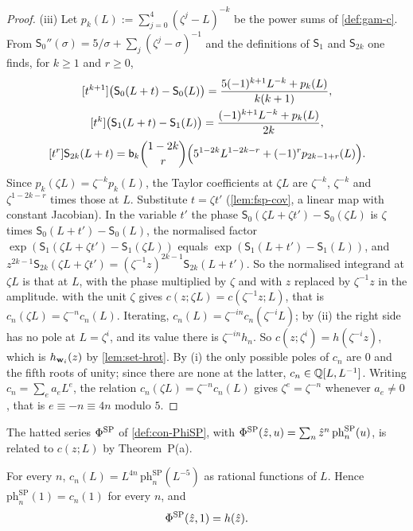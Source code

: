 \begin{proof}
(iii) Let $p_k(L):=\sum_{j=0}^4(\zeta^j-L)^{-k}$ be the power sums of \cref{def:gam-c}. From $\mathsf S_0''(\sigma)=5/\sigma+\sum_j(\zeta^j-\sigma)^{-1}$ and the definitions of $\mathsf S_1$ and $\mathsf S_{2k}$ one finds, for $k\geq 1$ and $r\geq 0$,
\begin{gather*}
\coef{t^{k+1}}\bigl(\mathsf S_0(L+t)-\mathsf S_0(L)\bigr)=\frac{5(-1)^{k+1}L^{-k}+p_k(L)}{k(k+1)},\\
\coef{t^{k}}\bigl(\mathsf S_1(L+t)-\mathsf S_1(L)\bigr)=\frac{(-1)^{k+1}L^{-k}+p_k(L)}{2k},
\end{gather*}
\[
[t^r]\mathsf S_{2k}(L+t)=\mathsf{b}_k\binom{1-2k}{r}\Bigl(5^{1-2k}L^{1-2k-r}+(-1)^rp_{2k-1+r}(L)\Bigr).
\]
Since $p_k(\zeta L)=\zeta^{-k}p_k(L)$, the Taylor coefficients at $\zeta L$ are $\zeta^{-k}$, $\zeta^{-k}$ and $\zeta^{1-2k-r}$ times those at $L$. Substitute $t=\zeta t'$ (\cref{lem:fsp-cov}, a linear map with constant Jacobian). In the variable $t'$ the phase $\mathsf S_0(\zeta L+\zeta t')-\mathsf S_0(\zeta L)$ is $\zeta$ times $\mathsf S_0(L+t')-\mathsf S_0(L)$, the normalised factor $\exp(\mathsf S_1(\zeta L+\zeta t')-\mathsf S_1(\zeta L))$ equals $\exp(\mathsf S_1(L+t')-\mathsf S_1(L))$, and $z^{2k-1}\mathsf S_{2k}(\zeta L+\zeta t')=(\zeta^{-1}z)^{2k-1}\mathsf S_{2k}(L+t')$. So the normalised integrand at $\zeta L$ is that at $L$, with the phase multiplied by $\zeta$ and with $z$ replaced by $\zeta^{-1}z$ in the amplitude.  with the unit $\zeta$ gives $c(z;\zeta L)=c(\zeta^{-1}z;L)$, that is $c_n(\zeta L)=\zeta^{-n}c_n(L)$. Iterating, $c_n(L)=\zeta^{-in}c_n(\zeta^{-i}L)$; by (ii) the right side has no pole at $L=\zeta^i$, and its value there is $\zeta^{-in}h_n$. So $c(z;\zeta^i)=h(\zeta^{-i}z)$, which is $h_{\mathbf{w}_i}(z)$ by \cref{lem:set-hrot}. By (i) the only possible poles of $c_n$ are $0$ and the fifth roots of unity; since there are none at the latter, $c_n\in\mathbb{Q}[L,L^{-1}]$. Writing $c_n=\sum_ea_eL^e$, the relation $c_n(\zeta L)=\zeta^{-n}c_n(L)$ gives $\zeta^e=\zeta^{-n}$ whenever $a_e\neq 0$, that is $e\equiv -n\equiv 4n$ modulo $5$.
\end{proof}

The hatted series $\Phi^{\mathrm{SP}}$ of \cref{def:con-PhiSP}, with $\Phi^{\mathrm{SP}}(\hat{z},u)=\sum_n\hat{z}^n\,\mathrm{ph}^{\mathrm{SP}}_n(u)$, is related to $c(z;L)$ by Theorem~P(a).

\begin{prop}
\label{prop:gam-hatflat}
For every $n$, $c_n(L)=L^{4n}\,\mathrm{ph}^{\mathrm{SP}}_n(L^{-5})$ as rational functions of $L$. Hence $\mathrm{ph}^{\mathrm{SP}}_n(1)=c_n(1)$ for every $n$, and
\[
\Phi^{\mathrm{SP}}(\hat{z},1)=h(\hat{z}).
\]
\end{prop}

